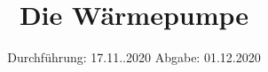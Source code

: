 


\subject{D206}
\title{Die Wärmepumpe}
\date{%
  Durchführung: 17.11..2020
  \hspace{3em}
  Abgabe: 01.12.2020
}



\maketitle
\thispagestyle{empty}
\tableofcontents
\newpage






\printbibliography{}


